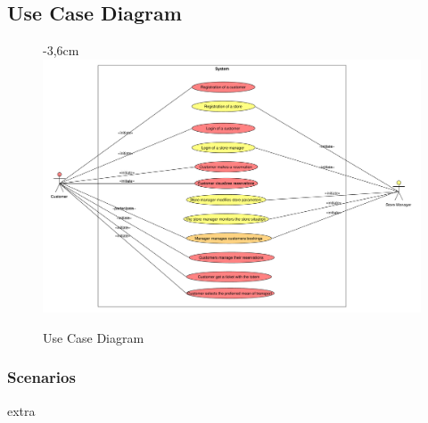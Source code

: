\documentclass{article}
\begin{document}
		\subsection{Use Case Diagram}
		
		\begin{figure}[!htb]
			\begin{adjustwidth} {-3,6cm}{}
				\centering
				\includegraphics[scale=0.42]{UC/1_useCaseDiagram.pdf}\\
				\caption{Use Case Diagram}
			\end{adjustwidth}
			
		\end{figure}
		
		\subsubsection{Scenarios}
		extra
		\newpage
\end{document}
